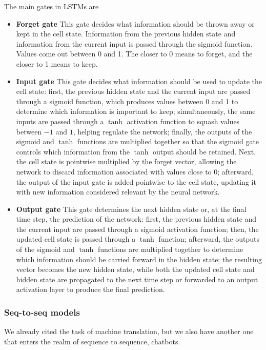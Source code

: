 The main gates in LSTMs are
\begin{itemize}
    \item \textbf{Forget gate} \ra This gate decides what information should be thrown away or kept in the cell state. Information from
the previous hidden state and information from the current input is passed through the sigmoid
function. Values come out between 0 and 1. The closer to 0 means to forget, and the closer to 1 means
to keep.
    \item \textbf{Input gate} \ra This gate decides what information should be used to update the cell state: first, the previous hidden state and the current input are passed through a sigmoid function, which produces values between 0 and 1 to determine which information is important to keep; simultaneously, the same inputs are passed through a $\tanh$ activation function to squash values between $-1$ and $1$, helping regulate the network; finally, the outputs of the sigmoid and $\tanh$ functions are multiplied together so that the sigmoid gate controls which information from the $\tanh$ output should be retained. Next, the cell state is pointwise multiplied by the forget vector, allowing the network to discard information associated with values close to 0; afterward, the output of the input gate is added pointwise to the cell state, updating it with new information considered relevant by the neural network.
    \item \textbf{Output gate} \ra  This gate determines the next hidden state or, at the final time step, the prediction of the network: first, the previous hidden state and the current input are passed through a sigmoid activation function; then, the updated cell state is passed through a $\tanh$ function; afterward, the outputs of the sigmoid and $\tanh$ functions are multiplied together to determine which information should be carried forward in the hidden state; the resulting vector becomes the new hidden state, while both the updated cell state and hidden state are propagated to the next time step or forwarded to an output activation layer to produce the final prediction.
\end{itemize}


\subsubsection{Seq-to-seq models}

We already cited the task of machine translation, but we also have another one that enters the realm of sequence to sequence, chatbots. 


